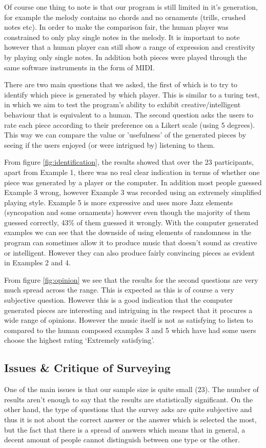 \documentclass[pdftex,12pt,a4paper]{report}
\begin{document}
Of course one thing to note is that our program is still limited in it's generation, for example the melody contains no chords and no ornaments (trills, crushed notes etc). In order to make the comparison fair, the human player was constrained to only play single notes in the melody. It is important to note however that a human player can still show a range of expression and creativity by playing only single notes. In addition both pieces were played through the same software instruments in the form of MIDI.

There are two main questions that we asked, the first of which is to try to identify which piece is generated by which player. This is similar to a turing test, in which we aim to test the program's ability to exhibit creative/intelligent behaviour that is equivalent to a human. The second question asks the users to rate each piece according to their preference on a Likert scale (using 5 degrees). This way we can compare the value or 'usefulness' of the generated pieces by seeing if the users enjoyed (or were intrigued by) listening to them.

From figure \ref{fig:identification}, the results showed that over the 23 participants, apart from Example 1, there was no real clear indication in terms of whether one piece was generated by a player or the computer. In addition most people guessed Example 3 wrong, however Example 3 was recorded using an extremely simplified playing style. Example 5 is more expressive and uses more Jazz elements (syncopation and some ornaments) however even though the majority of them guessed correctly, 43\% of them guessed it wrongly. With the computer generated examples we can see that the downside of using elements of randomness in the program can sometimes allow it to produce music that doesn't sound as creative or intelligent. However they can also produce fairly convincing pieces as evident in Examples 2 and 4.

From figure \ref{fig:opinion} we see that the results for the second questions are very much spread across the range. This is expected as this is of course a very subjective question. However this is a good indication that the computer generated pieces are interesting and intriguing in the respect that it procures a wide range of opinions. However the music itself is not as satisfying to listen to compared to the human composed examples  3 and 5 which have had some users choose the highest rating `Extremely satisfying'. 


\subsection{Issues \& Critique of Surveying}
One of the main issues is that our sample size is quite small (23). The number of results aren't enough to say that the results are statistically significant. On the other hand, the type of questions that the survey asks are quite subjective and thus it is not about the correct answer or the answer which is selected the most, but the fact that there is a spread of answers which means that in general, a decent amount of people cannot distinguish between one type or the other. 
\end{document}
